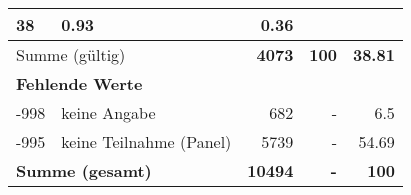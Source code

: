 \begin{longtable}{lXrrr}
       \num{38} &
       \num[round-mode=places,round-precision=2]{0.93} &
         \num[round-mode=places,round-precision=2]{0.36} \\
     \midrule
     \multicolumn{2}{l}{Summe (gültig)} &
       \textbf{\num{4073}} &
     \textbf{\num{100}} &
       \textbf{\num[round-mode=places,round-precision=2]{38.81}} \\
     \multicolumn{5}{l}{\textbf{Fehlende Werte}}\\
       -998 &
       keine Angabe &
         \num{682} &
        - &
         \num[round-mode=places,round-precision=2]{6.5} \\
       -995 &
       keine Teilnahme (Panel) &
         \num{5739} &
        - &
         \num[round-mode=places,round-precision=2]{54.69} \\
     \midrule
     \multicolumn{2}{l}{\textbf{Summe (gesamt)}} &
          \textbf{\num{10494}} &
        \textbf{-} &
        \textbf{\num{100}} \\
     \bottomrule
     \end{longtable}
     
